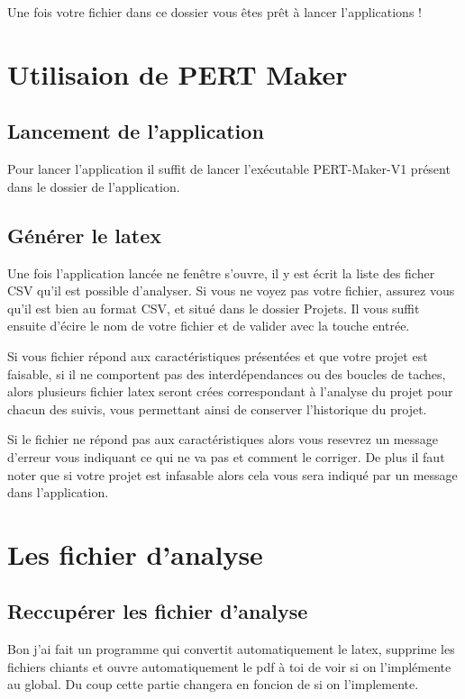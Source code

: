 \documentclass{article}
\begin{document}
Une fois votre fichier dans ce dossier vous êtes prêt à lancer l'applications !

\section{Utilisaion de PERT Maker}
\subsection{Lancement de l'application}
Pour lancer l'application il suffit de lancer l'exécutable PERT-Maker-V1 présent dans le dossier de l'application. 
\subsection{Générer le latex}
Une fois l'application lancée ne fenêtre s'ouvre, il y est écrit la liste des ficher CSV qu'il est possible d'analyser.
Si vous ne voyez pas votre fichier, assurez vous qu'il est bien au format CSV, et situé dans le dossier Projets.
Il vous suffit ensuite d'écire le nom de votre fichier et de valider avec la touche entrée.

Si vous fichier répond aux caractéristiques présentées et que votre projet est faisable, si il ne comportent pas des interdépendances ou des boucles de taches, alors plusieurs fichier latex seront crées correspondant à l'analyse du projet pour chacun des suivis, vous permettant ainsi de conserver l'historique du projet.


Si le fichier ne répond pas aux caractéristiques alors vous resevrez un message d'erreur vous indiquant ce qui ne va pas et comment le corriger. De plus il faut noter que si votre projet est infasable alors cela vous sera indiqué par un message dans l'application.

\section{Les fichier d'analyse}
\subsection{Reccupérer les fichier d'analyse}
Bon j'ai fait un programme qui convertit automatiquement le latex, supprime les fichiers chiants et ouvre automatiquement le pdf à toi de voir si on l'implémente au global. Du coup cette partie changera en foncion de si on l'implemente. 

\subsection{}
\end{document}
